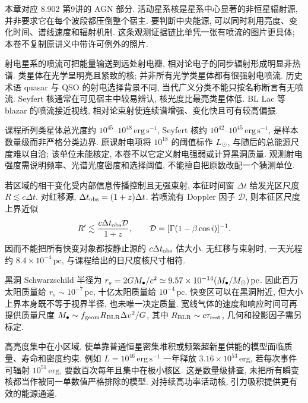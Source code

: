 
本章对应 8.902 第9讲的 AGN 部分. 活动星系核是星系中心显著的非恒星辐射源, 并非要求它在每个波段都压倒整个宿主. 要判断中央能源, 可以同时利用亮度、变化时间、谱线速度和辐射机制. 这条观测证据链比单凭一张有喷流的图片更具体; 本卷不复制原讲义中带许可例外的照片.

射电星系的喷流可把能量输送到远处射电瓣, 相对论电子的同步辐射形成明显非热谱. 类星体在光学呈明亮且紧致的核; 并非所有光学类星体都有很强射电喷流. 历史术语 quasar 与 QSO 的射电选择背景不同, 当代广义分类不能只按名称断言有无喷流. Seyfert 核通常在可见宿主中较易辨认, 核光度比最亮类星体低. BL Lac 等 blazar 的喷流接近视线, 相对论束射使连续谱增强、变化快且可有较高偏振.

课程所列类星体总光度约 $10^{45}$--$10^{48}\,\mathrm{erg\,s^{-1}}$, Seyfert 核约 $10^{42}$--$10^{45}\,\mathrm{erg\,s^{-1}}$, 是样本数量级而非严格分类边界. 原课射电项将 $10^{18}$ 的阈值标作 $L_{\odot}$, 与随后的总能源尺度难以自洽; 该单位未能核定, 本卷不以它定义射电强弱或计算黑洞质量. 观测射电强度需说明频率、光谱光度密度和选择阈值, 不能擅自把原数改配一个猜测单位.

若区域的相干变化受内部信息传播控制且无强束射, 本征时间窗 $\Delta t$ 给发光区尺度 $R\lesssim c\Delta t$. 对红移源, $\Delta t_{\rm obs}=(1+z)\Delta t$. 若喷流有 Doppler 因子 $\mathcal D$, 则本征区尺度上界近似
\[
R'\lesssim\frac{c\Delta t_{\rm obs}\mathcal D}{1+z},\qquad
\mathcal D=[\Gamma(1-\beta\cos i)]^{-1}.
\]
因而不能把所有快变对象都按静止源的 $c\Delta t_{\rm obs}$ 估大小. 无红移与束射时, 一天光程约 $8.4\times10^{-4}\,\mathrm{pc}$, 与课程给出的日尺度核尺寸相符.

黑洞 Schwarzschild 半径为 $r_s=2GM_\bullet/c^2\simeq9.57\times10^{-14}(M_\bullet/M_{\odot})\,\mathrm{pc}$. 因此百万太阳质量给 $r_s\sim10^{-7}\,\mathrm{pc}$, 十亿太阳质量给 $10^{-4}\,\mathrm{pc}$. 快变区可以在黑洞附近, 但大小上界本身既不等于视界半径, 也未唯一决定质量. 宽线气体的速度和响应时间可再提供质量尺度 $M_\bullet\sim f_{\rm geom}R_{\rm BLR}\Delta v^2/G$, 其中 $R_{\rm BLR}\sim c\tau_{\rm rest}$, 几何和投影因子需另标定.

高亮度集中在小区域, 使单靠普通恒星密集堆积或频繁超新星供能的模型面临质量、寿命和密度约束. 例如 $L=10^{46}\,\mathrm{erg\,s^{-1}}$ 一年释放 $3.16\times10^{53}\,\mathrm{erg}$, 若每次事件可辐射 $10^{51}\,\mathrm{erg}$, 要数百次每年且集中在极小核区. 这是数量级排查, 未把所有瞬变核都当作被同一单数值严格排除的模型. 对持续高功率活动核, 引力吸积提供更有效的能源通道.

